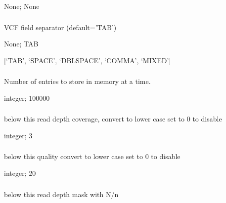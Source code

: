 \documentclass[letterpaper,11pt,english]{sphinxmanual}
\begin{document}
 None;  None


\subsubsection{}
\label{\detokenize{prog_desc:id36}}
 VCF field separator (default=’TAB’)

 None;  TAB

 {[}‘TAB’, ‘SPACE’, ‘DBLSPACE’, ‘COMMA’, ‘MIXED’{]}


\subsubsection{}
\label{\detokenize{prog_desc:id37}}
 Number of entries to store in memory at a time.

 integer;  100000


\subsubsection{}
\label{\detokenize{prog_desc:low-depth-lowdepth}}
 below this read depth coverage, convert to lower case set to 0 to disable

 integer;  3


\subsubsection{}
\label{\detokenize{prog_desc:low-qual-lowqual}}
 below this quality convert to lower case set to 0 to disable

 integer;  20


\subsubsection{}
\label{\detokenize{prog_desc:mask-depth-maskdepth}}
 below this read depth mask with N/n
\end{document}
